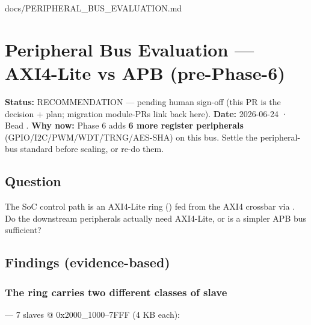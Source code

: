 \begin{relocated}{docs/PERIPHERAL_BUS_EVALUATION.md}
\section{Peripheral Bus Evaluation --- AXI4-Lite vs APB (pre-Phase-6)}\label{tm:dec:peripheral-bus}

\textbf{Status:} RECOMMENDATION --- pending human sign-off (this PR is
the decision + plan; migration module-PRs link back here).
\textbf{Date:} 2026-06-24 · Bead .
\textbf{Why now:} Phase 6 adds \textbf{6 more register peripherals}
(GPIO/\allowbreak{}I2C/\allowbreak{}PWM/\allowbreak{}WDT/\allowbreak{}TRNG/\allowbreak{}AES-SHA)
on this bus. Settle the peripheral-bus standard before scaling, or re-do
them.

\subsection{Question}\label{tm:dec:peripheral-bus:1-question}

The SoC control path is an AXI4-Lite ring
() fed from the AXI4 crossbar via
. Do the downstream peripherals actually need
AXI4-Lite, or is a simpler APB bus sufficient?

\subsection{Findings (evidence-based)}\label{tm:dec:peripheral-bus:2-findings-evidence-based}

\subsubsection{The ring carries two different classes of slave}\label{tm:dec:peripheral-bus:the-ring-carries-two-different-classes-of-slave}

 --- 7 slaves @
0x2000\_\allowbreak{}1000--7FFF (4 KB each):


\end{relocated}
